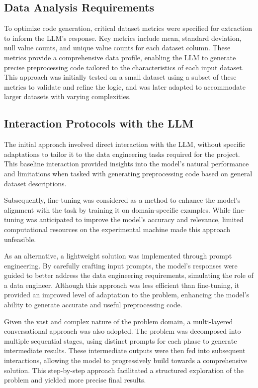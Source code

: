 \subsection{Data Analysis Requirements}
To optimize code generation, critical dataset metrics were specified for extraction to inform the LLM's response. Key metrics include mean, standard deviation, null value counts, and unique value counts for each dataset column. These metrics provide a comprehensive data profile, enabling the LLM to generate precise preprocessing code tailored to the characteristics of each input dataset. This approach was initially tested on a small dataset using a subset of these metrics to validate and refine the logic, and was later adapted to accommodate larger datasets with varying complexities.

\subsection{Interaction Protocols with the LLM}
The initial approach involved direct interaction with the LLM, without specific adaptations to tailor it to the data engineering tasks required for the project. This baseline interaction provided insights into the model's natural performance and limitations when tasked with generating preprocessing code based on general dataset descriptions.

Subsequently, fine-tuning was considered as a method to enhance the model's alignment with the task by training it on domain-specific examples. While fine-tuning was anticipated to improve the model's accuracy and relevance, limited computational resources on the experimental machine made this approach unfeasible.

As an alternative, a lightweight solution was implemented through prompt engineering. By carefully crafting input prompts, the model's responses were guided to better address the data engineering requirements, simulating the role of a data engineer. Although this approach was less efficient than fine-tuning, it provided an improved level of adaptation to the problem, enhancing the model's ability to generate accurate and useful preprocessing code.

Given the vast and complex nature of the problem domain, a multi-layered conversational approach was also adopted. The problem was decomposed into multiple sequential stages, using distinct prompts for each phase to generate intermediate results. These intermediate outputs were then fed into subsequent interactions, allowing the model to progressively build towards a comprehensive solution. This step-by-step approach facilitated a structured exploration of the problem and yielded more precise final results.

